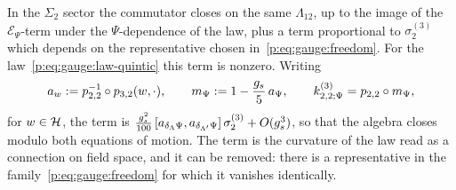 In the $\Sigma_2$ sector the commutator closes on the same $\Lambda_{12}$, up to the image of the $\mathcal E_\Psi$-term under the $\Psi$-dependence of the law, plus a term proportional to $\sigma_2^{(3)}$ which depends on the representative chosen in~\eqref{p:eq:gauge:freedom}.
For the law~\eqref{p:eq:gauge:law-quintic} this term is nonzero.
Writing
\begin{equation}
  \label{p:eq:gauge:a-w}
  a_w
    := \sprod{2}{2}^{-1} \circ \sprod{3}{2}(w, \cdot),
  \qquad
  m_\Psi
    := 1 - \frac{\gs}{5} \, a_\Psi,
  \qquad
  \kin{2}{\Psi}{3}
    = \sprod{2}{2} \circ m_\Psi,
\end{equation}
for $w \in \mathcal{H}$, the term is $\tfrac{g_s^2}{100} \, [a_{\delta_{\Lambda} \Psi}, a_{\delta_{\Lambda'} \Psi}] \, \sigma_2^{(3)} + O(g_s^3)$, so that the algebra closes modulo both equations of motion.
The term is the curvature of the law read as a connection on field space, and it can be removed: there is a representative in the family~\eqref{p:eq:gauge:freedom} for which it vanishes identically.

